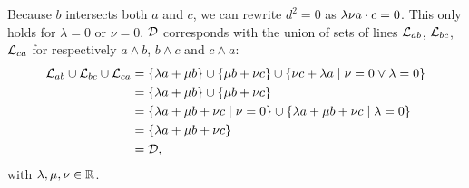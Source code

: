 Because $b$ intersects both $a$ and $c$, we can rewrite $d^2 = 0$ as $\lambda \nu a \mathbin{\cdot} c = 0$.  This only holds for $\lambda = 0$ or $\nu = 0$.  $\mathcal{D}$ corresponds with the union of sets of lines $\mathcal{L}_{ab}$, $\mathcal{L}_{bc}$, $\mathcal{L}_{ca}$ for respectively $a \wedge b$, $b \wedge c$ and $c \wedge a$:
\begin{align*}
  \mathcal{L}_{ab} \cup \mathcal{L}_{bc} \cup \mathcal{L}_{ca} &= \left\{ \lambda a + \mu b \right\} \cup \left\{ \mu b + \nu c \right\} \cup \left\{ \nu c + \lambda a \mid \nu = 0 \vee \lambda = 0 \right\} \\
  &= \left\{ \lambda a + \mu b \right\} \cup \left\{ \mu b + \nu c \right\} \\
  &= \left\{ \lambda a + \mu b + \nu c \mid \nu = 0 \right\} \cup \left\{ \lambda a + \mu b + \nu c \mid \lambda = 0 \right\} \\
  &= \left\{ \lambda a + \mu b + \nu c \right\} \\
  &= \mathcal{D} ,
\end{align*}
with $\lambda, \mu, \nu \in \mathbb{R}$.
